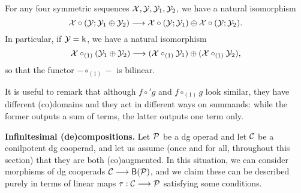 \begin{lemma}
For any four symmetric sequences $\mathcal{X},\mathcal{Y},\mathcal{Y}_1,\mathcal{Y}_2$,
we have a natural isomorphism
\[ \mathcal{X}\circ (\mathcal{Y};\mathcal{Y}_1\oplus \mathcal{Y}_2) \longrightarrow 
				\mathcal{X}\circ (\mathcal{Y};\mathcal{Y}_1) \oplus \mathcal{X}\circ (\mathcal{Y};\mathcal{Y}_2).\]
In particular, if $\mathcal{Y}=\Bbbk$, we have a natural isomorphism				
\[ \mathcal{X}\circ_{(1)} (\mathcal{Y}_1\oplus \mathcal{Y}_2) \longrightarrow 
				(\mathcal{X}\circ_{(1)} \mathcal{Y}_1) \oplus (\mathcal{X}\circ_{(1)} \mathcal{Y}_2),\]
so that the functor $-\circ_{(1)}-$ is bilinear.
\end{lemma}

It is useful to remark that although $f\circ' g$ and $f\circ_{(1)} g$
look similar, they have different (co)domains and they act in different
ways on summands: while the former outputs a sum of terms, the latter
outputs one term only.

\medskip

\textbf{Infinitesimal (de)compositions.}
Let ${\mathcal{P}}$ be a dg operad and let $\mathcal{C}$ be a conilpotent
dg cooperad, and let us assume (once and for all, throughout
this section) that they are both (co)augmented. In this
situation, we can consider morphisms of dg cooperads
$\mathcal{C} \longrightarrow \mathsf{B}({\mathcal{P}})$, and we claim these
can be described purely in terms of linear maps
$\tau :\mathcal{C} \longrightarrow {\mathcal{P}}$ satisfying some conditions.

